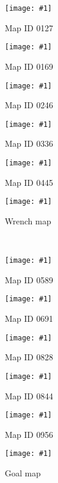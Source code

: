 \def\figw{0.16\columnwidth}%
\newcommand{\formatcaption}[1]{%
\tiny\begin{center}{#1}\end{center}}%
\newcommand{\includesnapshot}[2]{%
  \parbox{\figw}{\texttt{[image: \#1]}\\\vspace{-2.5ex}\formatcaption{#2}}}%
\includesnapshot{./exp-results/training-09x09-0127.png}{Map ID 0127} 
\includesnapshot{./exp-results/training-09x09-0169.png}{Map ID 0169} 
\includesnapshot{./exp-results/training-09x09-0246.png}{Map ID 0246} 
\includesnapshot{./exp-results/training-09x09-0336.png}{Map ID 0336} 
\includesnapshot{./exp-results/training-09x09-0445.png}{Map ID 0445}
\includesnapshot{./exp-results/planning-09x09-0004.png}{Wrench map}\\
\vspace{1ex}
\includesnapshot{./exp-results/training-09x09-0589.png}{Map ID 0589} 
\includesnapshot{./exp-results/training-09x09-0691.png}{Map ID 0691} 
\includesnapshot{./exp-results/training-09x09-0828.png}{Map ID 0828} 
\includesnapshot{./exp-results/training-09x09-0844.png}{Map ID 0844} 
\includesnapshot{./exp-results/training-09x09-0956.png}{Map ID 0956}
\includesnapshot{./exp-results/planning-09x09-0006.png}{Goal map}
